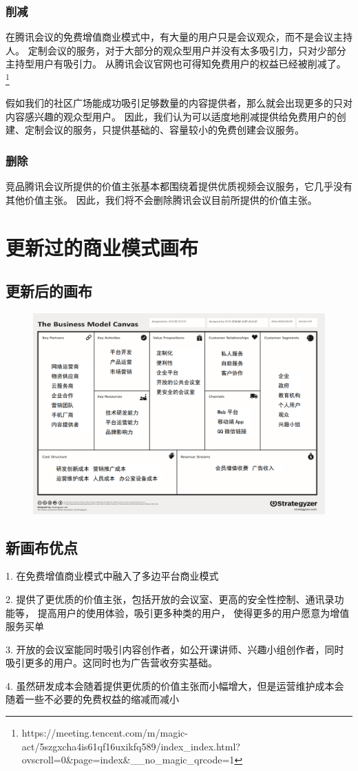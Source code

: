 \documentclass[a4paper,12pt]{article}
\begin{document}
    \subsubsection{削减}
    在腾讯会议的免费增值商业模式中，有大量的用户只是会议观众，而不是会议主持人。
    定制会议的服务，对于大部分的观众型用户并没有太多吸引力，只对少部分主持型用户有吸引力。
    从腾讯会议官网也可得知免费用户的权益已经被削减了。
    \footnote{https://meeting.tencent.com/m/magic-act/5szgxcha4is61qf16uxikfq589/index\_index.html?ovscroll=0\&page=index\&\_\_no\_magic\_qrcode=1}

    假如我们的社区广场能成功吸引足够数量的内容提供者，那么就会出现更多的只对内容感兴趣的观众型用户。
    因此，我们认为可以适度地削减提供给免费用户的创建、定制会议的服务，只提供基础的、容量较小的免费创建会议服务。

    \subsubsection{删除}

    竞品腾讯会议所提供的价值主张基本都围绕着提供优质视频会议服务，它几乎没有其他价值主张。
    因此，我们将不会删除腾讯会议目前所提供的价值主张。

    

\section{更新过的商业模式画布}
    \subsection{更新后的画布}
    \clearpage
    \begin{figure}[htbp]
        \centering
        \includegraphics[scale=0.3]{png/更新画布}
        \caption{}
    \end{figure}

    \subsection{新画布优点}

    1.
    在免费增值商业模式中融入了多边平台商业模式

    2.
    提供了更优质的价值主张，包括开放的会议室、更高的安全性控制、通讯录功能等， 提高用户的使用体验，吸引更多种类的用户，
    使得更多的用户愿意为增值服务买单

    3.
    开放的会议室能同时吸引内容创作者，如公开课讲师、兴趣小组创作者，同时吸引更多的用户。这同时也为广告营收夯实基础。

    4.
    虽然研发成本会随着提供更优质的价值主张而小幅增大，但是运营维护成本会随着一些不必要的免费权益的缩减而减小


    
\end{document}
